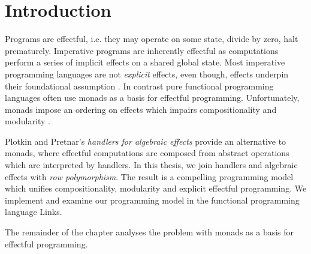 \chapter{Introduction}
Programs are effectful, i.e. they may operate on some state, divide by zero, halt prematurely.
Imperative programs are inherently effectful as computations perform a series of implicit effects on a shared global state.
Most imperative programming languages are not \emph{explicit} effects, even though, effects underpin their foundational assumption \cite{Meijer2014}.
In contrast pure functional programming languages often use monads as a basis for effectful programming. Unfortunately, monads impose an ordering on effects which impairs compositionality and modularity \cite{Kammar2013}.

Plotkin and Pretnar's \emph{handlers for algebraic effects} \cite{Plotkin2013} provide an alternative to monads, where effectful computations are composed from abstract operations which are interpreted by handlers. In this thesis, we join handlers and algebraic effects with \emph{row polymorphism}. The result is a compelling programming model which unifies compositionality, modularity and explicit effectful programming. We implement and examine our programming model in the functional programming language Links.

The remainder of the chapter analyses the problem with monads as a basis for effectful programming.

